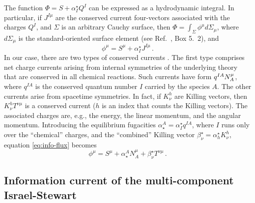 \documentclass[
a4paper,
amsfonts,
amsmath,
reprint,
showkeys,
nofootinbib,
twoside,
onecolumn,
notitlepage
]{revtex4-1}
\begin{document}
	The function $\Phi=S+\alpha^\star_I Q^I$ can be expressed as a hydrodynamic integral. 
	In particular, if $J^{I\mu}$ are the conserved current four-vectors associated with the charges $Q^I$, and $\Sigma$ is an arbitrary Cauchy surface, then $\Phi=\int_\Sigma \phi^\mu d\Sigma_\mu$, where $d\Sigma_\mu$ is the standard-oriented surface element (see Ref.\ \cite{MTW_book}, Box 5.\ 2), and
	\begin{equation}\label{eq:info-flux}
		\phi^\mu = S^\mu +\alpha^\star_I J^{I\mu} \, .
	\end{equation}
	In our case, there are two types of conserved currents \cite{GavassinoStabilityCarter2022}. 
The first type comprises net charge currents arising from internal symmetries of the underlying theory that are conserved in all chemical reactions.
	Such currents have form $q\indices{^I ^A}N^{\mu}_A$, where $q^{IA}$ is the conserved quantum number $I$ carried by the species $A$. 
	The other currents arise from spacetime symmetries. 
	In fact, if $K^h_\nu$ are Killing vectors, then $K^h_\nu T^{\nu \mu}$ is a conserved current ($h$ is an index that counts the Killing vectors).
	The associated charges are, e.g., the energy, the linear momentum, and the angular momentum. 
	Introducing the equilibrium fugacities $\alpha_\star^A=\alpha^\star_I q^{IA}$, where $I$ runs only over the ``chemical'' charges, and the ``combined'' Killing vector $\beta^\star_\nu = \alpha^\star_h K^h_\nu$, equation \eqref{eq:info-flux} becomes
	\begin{equation}\label{eq:info-flux-killing}
		\phi^\mu =S^\mu +\alpha_\star^A N^{\mu}_A + \beta^\star_\nu T^{\nu \mu} \, .
	\end{equation}
	
	
	\subsection{Information current of the multi-component Israel-Stewart}\label{sec:grundt}
	
\end{document}
